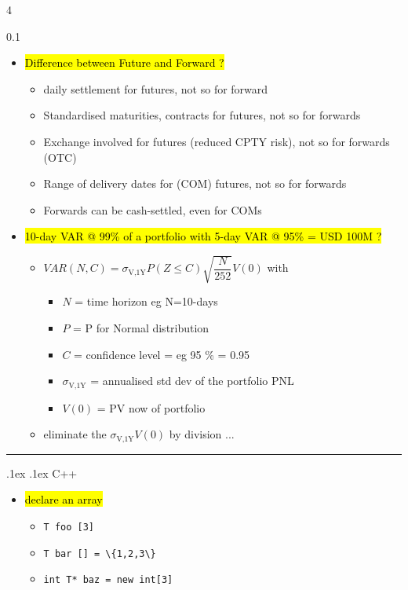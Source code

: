 \documentclass[10pt,landscape,a4paper]{article}
\makeatletter
\newcommand{\cicode}[1]{\colorbox{highlightgray}{\lstinline[basicstyle=\ttfamily\color{black}]|#1|} }
\renewcommand{\section}{\@startsection{section}{1}{0mm}%
                                {.1ex}%
                                {.1ex}%
                                {\color{blue}\sffamily\small\bfseries}}
\makeatother
\begin{document}
\begin{multicols*}{4}
\begin{spacing}{0.1}
\begin{itemize}
\item \hl{Difference between Future and Forward ?}
\begin{itemize}
	\item daily settlement for futures, not so for forward
	\item Standardised maturities, contracts for futures, not so for forwards
	\item Exchange involved for futures (reduced CPTY risk), not so for forwards (OTC)
	\item Range of delivery dates for (COM) futures, not so for forwards
	\item Forwards can be cash-settled, even for COMs
		
\end{itemize}

\item \hl{10-day VAR @ 99\% of a portfolio with 5-day VAR @ 95\% = USD 100M  ?}
\begin{itemize}
	\item $VAR(N,C)=\sigma_{\text{V,1Y}} P(Z \le C) \sqrt{ \dfrac{N}{252}}V(0)$ with
	\begin{itemize}
		\item $N$ = time horizon eg N=10-days
		\item $P$ = P for Normal distribution
		\item $C$ = confidence level = eg 95 \% = 0.95
		\item $\sigma_{\text{V,1Y}}$ = annualised std dev of the portfolio PNL
		\item $V(0)$ = PV now of portfolio
	\end{itemize}
	\item eliminate the $\sigma_{\text{V,1Y}} V(0)$ by division ...
\end{itemize}

\end{itemize}

\hrule
\section {C++}

\begin{itemize}

\item \hl{declare an array}
\begin{itemize}
\item \cicode{T foo [3]}
\item \cicode{T bar [] = \{1,2,3\} }
\item \cicode{int T* baz = new int[3]}
\end{itemize}


\end{itemize}
\end{spacing}
\end{multicols*}
\end{document}
